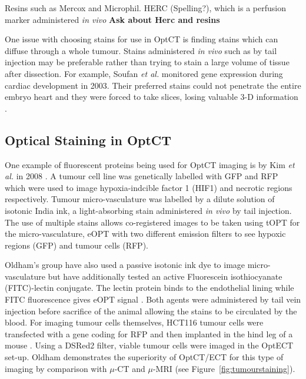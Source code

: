 \documentclass[12pt]{article}
\begin{document}
Resins such as Mercox and Microphil. HERC (Spelling?), which is a perfusion marker administered \textit{in vivo}
\textbf{Ask about Herc and resins}

One issue with choosing stains for use in OptCT is finding stains which can diffuse through a whole tumour. Stains administered \textit{in vivo} such as by tail injection may be preferable rather than trying to stain a large volume of tissue after dissection. For example, Soufan \textit{et al.} monitored gene expression during cardiac development in 2003. Their preferred stains  could not penetrate the entire embryo heart and they were forced to take slices, losing valuable 3-D information \cite{Soufan:2003cd}. 


\subsection{Optical Staining in OptCT}

One example of fluorescent proteins being used for OptCT imaging is by Kim \textit{et al.} in 2008 \cite{Kim:2008eua}. A tumour cell line was genetically labelled with GFP and RFP which were used to image hypoxia-indcible factor 1 (HIF1) and necrotic regions respectively. Tumour micro-vasculature was labelled by a dilute solution of isotonic India ink, a light-absorbing stain administered \textit{in vivo} by tail injection. The use of multiple stains allows co-registered images to be taken using tOPT for the micro-vasculature, eOPT with two different emission filters to see hypoxic regions (GFP) and tumour cells (RFP). 







Oldham's group have also used a passive isotonic ink dye to image micro-vasculature but have additionally tested an active  Fluorescein isothiocyanate (FITC)-lectin conjugate. The lectin protein binds to the endothelial lining while FITC fluorescence gives eOPT signal \cite{Oldham:2007ku}. Both agents were administered by tail vein injection before sacrifice of the animal allowing the stains to be circulated by the blood.  For imaging tumour cells themselves, HCT116 tumour cells were transfected with a gene coding for RFP and then implanted in the hind leg of a mouse \cite{Oldham:2006}. Using a DSRed2 filter, viable tumour cells were imaged in the OptECT set-up. Oldham demonstrates the superiority of OptCT/ECT for this type of imaging by comparison with $\mu$-CT and $\mu$-MRI (see Figure~\ref{fig:tumourstaining}).
\end{document}
